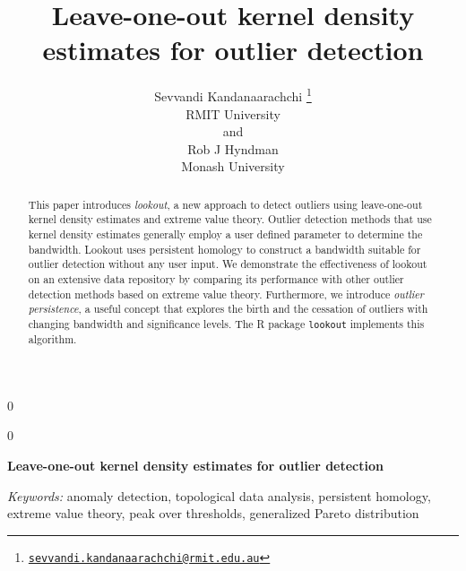 \documentclass[12pt]{article}
\newcommand{\blind}{0}
\theoremstyle{definition}
\theoremstyle{definition}
\theoremstyle{definition}
\theoremstyle{remark}
\begin{document}
\def\spacingset#1{\renewcommand{\baselinestretch}%
{#1}\small\normalsize} \spacingset{1}



\blind
{
  \title{\bf Leave-one-out kernel density estimates for outlier detection}

  \author{
        Sevvandi Kandanaarachchi \thanks{\href{mailto:sevvandi.kandanaarachchi@rmit.edu.au}{\nolinkurl{sevvandi.kandanaarachchi@rmit.edu.au}}} \\
    RMIT University\\
     and \\     Rob J Hyndman \\
    Monash University\\
      }
  \maketitle
} \fi

\blind
{
  \bigskip
  \bigskip
  \bigskip
  \begin{center}
    {\LARGE\bf Leave-one-out kernel density estimates for outlier detection}
  \end{center}
  \medskip
} \fi

\bigskip
\begin{abstract}
This paper introduces \emph{lookout}, a new approach to detect outliers using leave-one-out kernel density estimates and extreme value theory. Outlier detection methods that use kernel density estimates generally employ a user defined parameter to determine the bandwidth. Lookout uses persistent homology to construct a bandwidth suitable for outlier detection without any user input. We demonstrate the effectiveness of lookout on an extensive data repository by comparing its performance with other outlier detection methods based on extreme value theory. Furthermore, we introduce \emph{outlier persistence}, a useful concept that explores the birth and the cessation of outliers with changing bandwidth and significance levels. The R package \texttt{lookout} implements this algorithm.
\end{abstract}

\noindent%
{\it Keywords:} anomaly detection, topological data analysis, persistent homology, extreme value theory, peak over thresholds, generalized Pareto distribution
\vfill

\newpage
\spacingset{1.45} %
\end{document}
